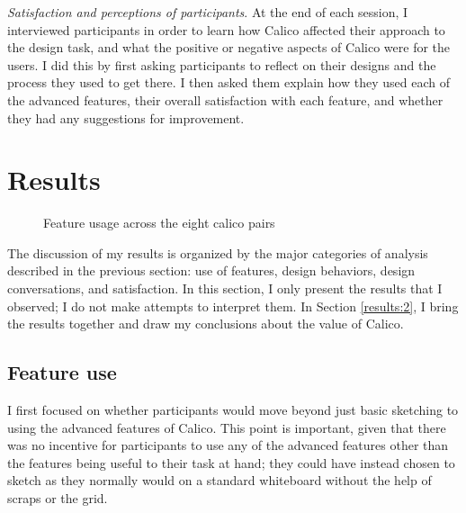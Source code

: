 \documentclass[12pt,fleqn]{ucithesis}
\begin{document}
    \emph{Satisfaction and perceptions of participants}. At the end of each session, I interviewed participants in order to learn how Calico affected their approach to the design task, and what the positive or negative aspects of Calico were for the users. I did this by first asking participants to reflect on their designs and the process they used to get there. I then asked them explain how they used each of the advanced features, their overall satisfaction with each feature, and whether they had any suggestions for improvement. 

\section{Results}
\label{results}



\begin{figure}
  \centering



\caption{Feature usage across the eight calico pairs}
\label{fig:6}       %
\end{figure}
%


The discussion of my results is organized by the major categories of analysis described in the previous section: use of features, design behaviors, design conversations, and satisfaction. In this section, I only present the results that I observed; I do not make attempts to interpret them. In Section \ref{results:2}, I bring the results together and draw my conclusions about the value of Calico.

\subsection{Feature use}
\label{results:1}

I first focused on whether participants would move beyond just basic sketching to using the advanced features of Calico. This point is important, given that there was no incentive for participants to use any of the advanced features other than the features being useful to their task at hand; they could have instead chosen to sketch as they normally would on a standard whiteboard without the help of scraps or the grid. 
\end{document}
